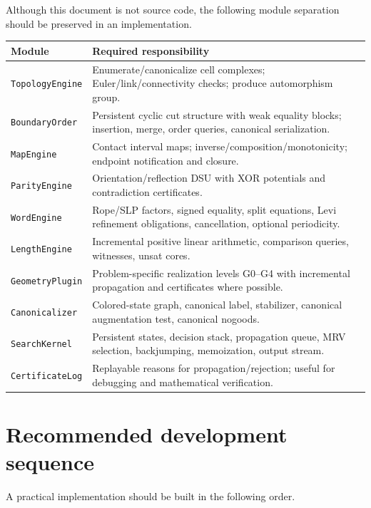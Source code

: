 \documentclass[11pt]{article}
\begin{document}
Although this document is not source code, the following module separation should be preserved in an implementation.

\begin{longtable}{p{}p{}}
\toprule
Module & Required responsibility \\
\midrule
\endhead
\texttt{TopologyEngine} & Enumerate/canonicalize cell complexes; Euler/link/connectivity checks; produce automorphism group. \\
\texttt{BoundaryOrder} & Persistent cyclic cut structure with weak equality blocks; insertion, merge, order queries, canonical serialization. \\
\texttt{MapEngine} & Contact interval maps; inverse/composition/monotonicity; endpoint notification and closure. \\
\texttt{ParityEngine} & Orientation/reflection DSU with XOR potentials and contradiction certificates. \\
\texttt{WordEngine} & Rope/SLP factors, signed equality, split equations, Levi refinement obligations, cancellation, optional periodicity. \\
\texttt{LengthEngine} & Incremental positive linear arithmetic, comparison queries, witnesses, unsat cores. \\
\texttt{GeometryPlugin} & Problem-specific realization levels G0--G4 with incremental propagation and certificates where possible. \\
\texttt{Canonicalizer} & Colored-state graph, canonical label, stabilizer, canonical augmentation test, canonical nogoods. \\
\texttt{SearchKernel} & Persistent states, decision stack, propagation queue, MRV selection, backjumping, memoization, output stream. \\
\texttt{CertificateLog} & Replayable reasons for propagation/rejection; useful for debugging and mathematical verification. \\
\bottomrule
\end{longtable}

\section{Recommended development sequence}

A practical implementation should be built in the following order.
\end{document}
